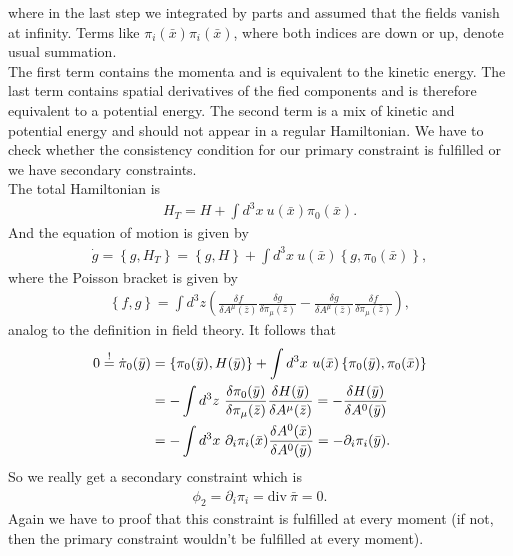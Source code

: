 where in the last step we integrated by parts and assumed that the fields vanish at infinity. Terms like $\pi_i(\bar{x})\pi_i(\bar{x})$, where both indices are down or up, denote usual summation. \\ 
The first term contains the momenta and is equivalent to the kinetic energy. The last term contains spatial derivatives of the fied components and is therefore equivalent to a potential energy. The second term is a mix of kinetic and potential energy and should not appear in a regular Hamiltonian. We have to check whether the consistency condition for our primary constraint is fulfilled or we have secondary constraints. \\
The total Hamiltonian is 
\begin{align}
H_T = H + \int d^3 x \ u(\bar{x}) \pi_0(\bar{x}).
\end{align}
And the equation of motion is given by 
\begin{align}
\dot{g} = \left \{ g,H_T \right \} = \left \{ g,H \right \} + \int d^3 x \ u(\bar{x}) \left \{ g,\pi_0(\bar{x}) \right \},
\end{align}
where the Poisson bracket is given by
\begin{align}
\left \{ f,g \right \} = \int d^3 z \left( \frac{\delta f}{\delta A^{\mu}(\bar{z})} \frac{\delta g}{\delta \pi_{\mu}(\bar{z})} - \frac{\delta g}{\delta A^{\mu}(\bar{z})} \frac{\delta f}{\delta \pi_{\mu}(\bar{z})}  \right),
\end{align}
analog to the definition in field theory. It follows that
\begin{align}
0 \overset{!}{=} \dot{\pi}_0(\bar{y}) &= \left \{ \pi_0(\bar{y}),H(\bar{y}) \right \} + \int d^3 x \ u(\bar{x}) \left \{ \pi_0(\bar{y}),\pi_0(\bar{x}) \right \} \notag \\
&= - \int d^3 z \ \frac{\delta \pi_0(\bar{y})}{\delta \pi_{\mu}(\bar{z})} \frac{\delta H(\bar{y})}{\delta A^{\mu}(\bar{z})} = - \frac{\delta H(\bar{y})}{\delta A^0(\bar{y})} \notag \\
&= - \int d^3 x \ \partial_i \pi_i(\bar{x}) \frac{\delta A^0(\bar{x})}{\delta A^0(\bar{y})} = - \partial_i \pi_i(\bar{y}).
\end{align}
\label{sec:electrodynamics_secondary_constraints}
So we really get a secondary constraint which is
\begin{align}
\phi_2 = \partial_i \pi_i = \text{div} \ \bar{\pi} = 0.
\end{align}
Again we have to proof that this constraint is fulfilled at every moment (if not, then the primary constraint wouldn't be fulfilled at every moment). \\

